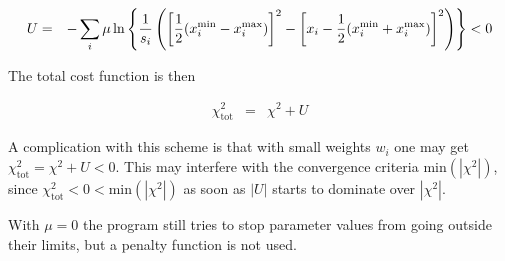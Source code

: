\documentclass[a4paper,12pt,pdftex,onecolumn]{article}
\begin{document}
\begin{eqnarray}
U &=& - \sum_i \mu \ln \left\{
{1 \over s_i} \left(
\left[ {1 \over 2}(x_i^{\mathrm{min}}-x_i^{\mathrm{max}}) \right]^2
- \left[ x_i - {1\over 2}(x_i^{\mathrm{min}} + x_i^{\mathrm{max}}) \right]^2
\right)
\right\}
< 0
\end{eqnarray}

The total cost function is then

\begin{eqnarray}
\chi^2_{\mathrm{tot}} &=& \chi^2 + U
\end{eqnarray}

A complication with this scheme is that with small weights $w_i$ one may
get $\chi^2_{\mathrm{tot}} = \chi^2 + U < 0$. This may interfere with the convergence
criteria $\mathrm{min}(|\chi^2|)$, since $\chi^2_{\mathrm{tot}} < 0 < \mathrm{min}(|\chi^2|)$
as soon as $|U|$ starts to dominate over $|\chi^2|$.

With $\mu=0$ the program still tries to stop parameter values from going outside their
limits, but a penalty function is not used.








\end{document}
